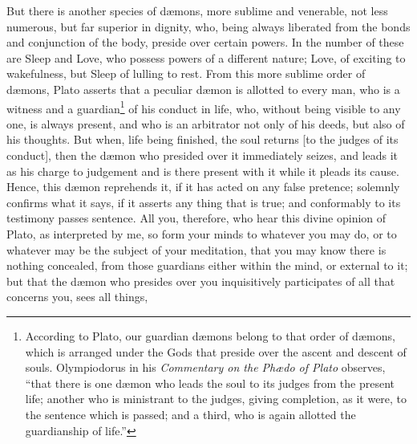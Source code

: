 \documentclass{article}
\begin{document}
But there is another species of d{\ae}mons, more sublime and venerable, not
less numerous, but far superior in dignity, who, being always liberated from
the bonds and conjunction of the body, preside over certain powers. In the
number of these are Sleep and Love, who possess powers of a different nature;
Love, of exciting to wakefulness, but Sleep of lulling to rest. From this more
sublime order of d{\ae}mons, Plato asserts that a peculiar d{\ae}mon is
allotted to every man, who is a witness and a guardian\footnote{According to
Plato, our guardian d{\ae}mons belong to that order of d{\ae}mons, which is
arranged under the Gods that preside over the ascent and descent of souls.
Olympiodorus in his \textit{Commentary on the Ph{\ae}do of Plato} observes,
``that there is one d{\ae}mon who leads the soul to its judges from the present
life; another who is ministrant to the judges, giving completion, as it were,
to the sentence which is passed; and a third, who is again allotted the
guardianship of life.''} of his conduct in life, who, without being visible to
any one, is always present, and who is an arbitrator not only of his deeds, but
also of his thoughts.  But when, life being finished, the soul returns [to the
judges of its conduct], then the d{\ae}mon who presided over it immediately
seizes, and leads it as his charge to judgement and is there present with it
while it pleads its cause. Hence, this d{\ae}mon reprehends it, if it has acted
on any false pretence; solemnly confirms what it says, if it asserts any thing
that is true; and conformably to its testimony passes sentence. All you,
therefore, who hear this divine opinion of Plato, as interpreted by me, so form
your minds to whatever you may do, or to whatever may be the subject of your
meditation, that you may know there is nothing concealed, from those guardians
either within the mind, or external to it; but that the d{\ae}mon who presides
over you inquisitively participates of all that concerns you, sees all things,
\end{document}
